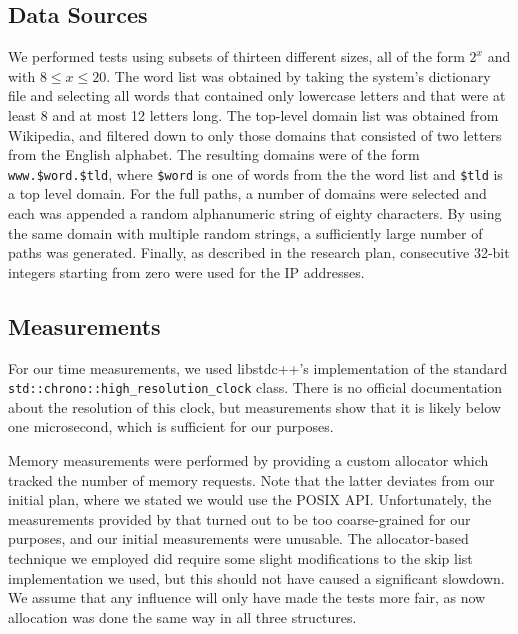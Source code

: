 \documentclass[12pt,a4paper]{article}
\begin{document}
    \subsection{Data Sources}

    We performed tests using subsets of thirteen different sizes, all of the form $2^x$ and with $8
    \le x \le 20$.  The word list was obtained by taking the system's dictionary file and selecting
    all words that contained only lowercase letters and that were at least 8 and at most 12 letters
    long.  The top-level domain list was obtained from Wikipedia, and filtered down to only those
    domains that consisted of two letters from the English alphabet.  The resulting domains were of
    the form \texttt{www.\$word.\$tld}, where \texttt{\$word} is one of words from the the word list
    and \texttt{\$tld} is a top level domain.  For the full paths, a number of domains were selected
    and each was appended a random alphanumeric string of eighty characters.  By using the same
    domain with multiple random strings, a sufficiently large number of paths was generated.
    Finally, as described in the research plan, consecutive 32-bit integers starting from zero were
    used for the IP addresses.

    \subsection{Measurements}
    \label{subsec:measurements}

    For our time measurements, we used libstdc++'s implementation of the standard
    \texttt{std::chrono::high\_resolution\_clock} class.  There is no official documentation about
    the resolution of this clock, but measurements show that it is likely below one microsecond,
    which is sufficient for our purposes.

    Memory measurements were performed by providing a custom allocator which tracked the number of
    memory requests.  Note that the latter deviates from our initial plan, where we stated we would
    use the POSIX API.  Unfortunately, the measurements provided by that turned out to be too
    coarse-grained for our purposes, and our initial measurements were unusable.  The
    allocator-based technique we employed did require some slight modifications to the skip list
    implementation we used, but this should not have caused a significant slowdown.  We assume that
    any influence will only have made the tests more fair, as now allocation was done the same way
    in all three structures.
\end{document}
